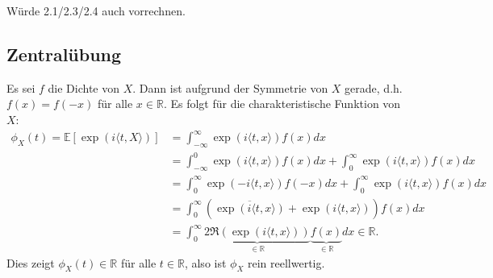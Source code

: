 \documentclass[a4paper]{article}
\begin{document}
\makeexheader

Würde 2.1/2.3/2.4 auch vorrechnen.

\subsection{Zentralübung}

Es sei $f$ die Dichte von $X$. Dann ist aufgrund der Symmetrie von $X$ gerade, d.h. $f(x) = f(-x)$ für alle $x \in \mathds{R}$. Es folgt für die charakteristische Funktion von $X$:
\begin{align*}
	\phi_X(t) = \mathds{E}[\exp(i \langle t, X \rangle)] & = \int_{-\infty}^{\infty} \exp(i\langle t, x \rangle) f(x) dx                                                                                     \\
	                                                     & = \int_{-\infty}^{0} \exp(i\langle t, x \rangle) f(x) dx + \int_{0}^{\infty} \exp(i\langle t, x \rangle) f(x) dx                                  \\
	                                                     & = \int_{0}^{\infty} \exp(-i\langle t, x \rangle) f(-x) dx + \int_{0}^{\infty} \exp(i\langle t, x \rangle) f(x) dx                                 \\
	                                                     & = \int_{0}^{\infty} (\overline{\exp(i\langle t, x \rangle)} + \exp(i\langle t, x \rangle)) f(x) dx
	\\
	                                                     & = \int_{0}^{\infty} \underbrace{2 \Re(\exp(i\langle t, x \rangle))}_{\in \mathds{R}} \underbrace{f(x)}_{\in \mathds{R}} dx \in \mathds{R}\text{.}
\end{align*}
Dies zeigt $\phi_X(t) \in \mathds{R}$ für alle $t \in \mathds{R}$, also ist $\phi_X$ rein reellwertig.

\addtocounter{subsection}{1}

\subsection{}
\end{document}
